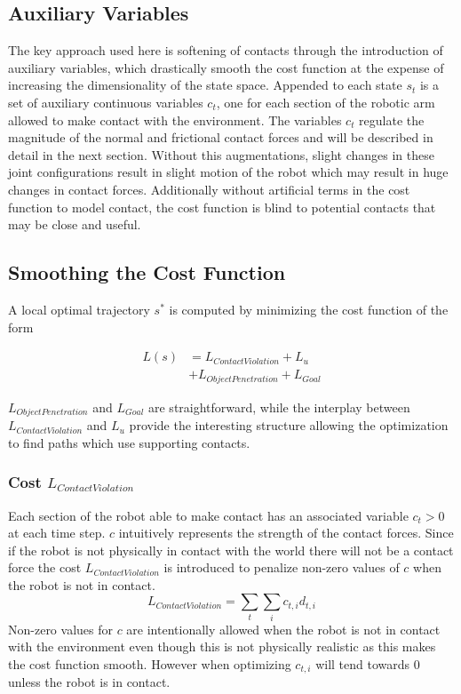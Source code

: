 \documentclass[../thesis.tex]{subfiles}
\begin{document}
\subsection{Auxiliary Variables}
The key approach used here is softening of contacts through the introduction of auxiliary variables, which drastically smooth the cost function at the expense of increasing the dimensionality of the state space.
Appended to each state $s_t$ is a set of auxiliary continuous variables $c_t$, one for each section of the robotic arm allowed to make contact with the environment.
The variables $c_t$ regulate the magnitude of the normal and frictional contact forces and will be described in detail in the next section.
Without this augmentations, slight changes in these joint configurations result in slight motion of the robot which may result in huge changes in contact forces.
Additionally without artificial terms in the cost function to model contact, the cost function is blind to potential contacts that may be close and useful.


\subsection{Smoothing the Cost Function}
A local optimal trajectory $s^*$ is computed by minimizing the cost function of the form

\begin{align}
L(s) &= L_{Contact Violation} + L_{u} \\
&+ L_{Object Penetration} + L_{Goal}    \label{eq:cost}
\end{align}
    
$L_{Object Penetration}$ and $L_{Goal}$ are straightforward, while the interplay between $L_{Contact Violation}$ and $L_u$ provide the interesting structure allowing the optimization to find paths which use supporting contacts.




\subsubsection{Cost $L_{Contact Violation}$}
Each section of the robot able to make contact has an associated variable $c_t > 0$ at each time step. $c$ intuitively represents the strength of the contact forces.
Since if the robot is not physically in contact with the world there will not be a contact force the cost $L_{Contact Violation}$ is introduced to penalize non-zero values of $c$ when the robot is not in contact. 
$$L_{Contact Violation} = \sum_t{\sum_i{c_{t,i} d_{t,i}}}$$
Non-zero values for $c$ are intentionally allowed when the robot is not in contact with the environment even though this is not physically realistic as this makes the cost function smooth.
However when optimizing $c_{t,i}$ will tend towards 0 unless the robot is in contact.
\end{document}
